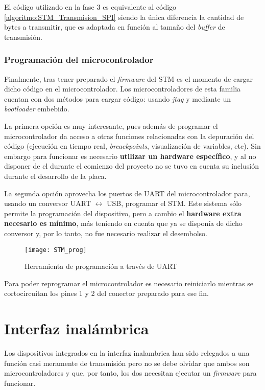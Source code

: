El código utilizado en la fase 3 es equivalente al código \ref{algoritmo:STM_Transmision_SPI} siendo la única diferencia la cantidad de bytes a transmitir, que es adaptada en función al tamaño del \textit{buffer} de transmisión.

\subsubsection{Programación del microcontrolador\label{sec:Software_micro_ESP}}

Finalmente, tras tener preparado el \textit{firmware} del STM es el momento de cargar dicho código en el microcontrolador. Los microcontroladores de esta familia cuentan con dos métodos para cargar código: usando \textit{jtag} y mediante un \textit{bootloader} embebido.

La primera opción es muy interesante, pues además de programar el microcontrolador da acceso a otras funciones relacionadas con la depuración del código (ejecución en tiempo real, \textit{breackpoints}, visualización de variables, etc). Sin embargo para funcionar es necesario \textbf{utilizar un hardware específico}, y al no disponer de el durante el comienzo del proyecto no se tuvo en cuenta su inclusión durante el desarrollo de la placa.

La segunda opción aprovecha los puertos de UART del microcontrolador para, usando un conversor UART $\leftrightarrow$ USB, programar el STM. Este sistema sólo permite la programación del dispositivo, pero a cambio el \textbf{hardware extra necesario es mínimo}, más teniendo en cuenta que ya se disponía de dicho conversor y, por lo tanto, no fue necesario realizar el desembolso.

\begin{figure} [h]
    \centering
    \texttt{[image: STM\_prog]}
    \caption{Herramienta de programación a través de UART}
    \label{fig:STM_prog}
\end{figure}

Para poder reprogramar el microcontrolador es necesario reiniciarlo mientras se cortocircuitan los pines 1 y 2 del conector preparado para ese fin.

\clearpage

\section{Interfaz inalámbrica\label{sec:Software_inalambrica}}

Los dispositivos integrados en la interfaz inalambrica han sido relegados a una función casi meramente de transmisión pero no se debe olvidar que ambos son microcontroladores y que, por tanto, los dos necesitan ejecutar un \textit{firmware} para funcionar.


